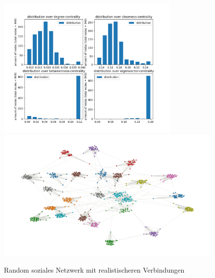 \FloatBarrier
\begin{figure}[h!]%
  \centering
  \includegraphics[width=0.8\textwidth]{Graphics/DensityALL.png}
  \includegraphics[width=1.0\textwidth]{Graphics/SNAall.png}
  \caption{Random soziales Netzwerk mit realistischeren Verbindungen}
  \label{fig:distributionALL}
\end{figure}
\FloatBarrier
